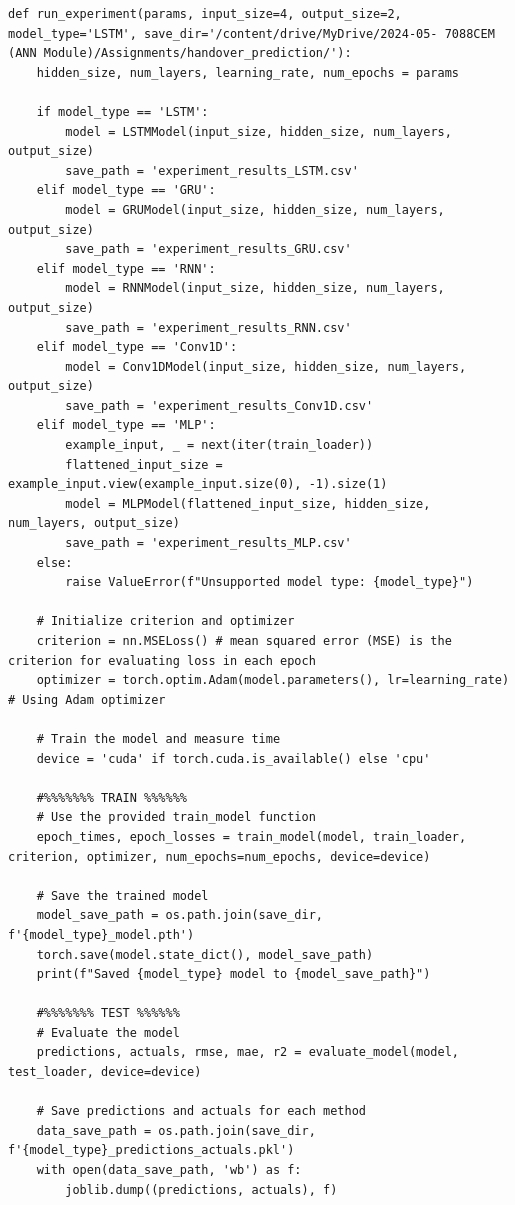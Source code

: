 \documentclass[journal,onecolumn]{IEEEtran}
\begin{document}
{\begin{appendices}
\begin{verbatim}
def run_experiment(params, input_size=4, output_size=2, model_type='LSTM', save_dir='/content/drive/MyDrive/2024-05- 7088CEM (ANN Module)/Assignments/handover_prediction/'):
    hidden_size, num_layers, learning_rate, num_epochs = params

    if model_type == 'LSTM':
        model = LSTMModel(input_size, hidden_size, num_layers, output_size)
        save_path = 'experiment_results_LSTM.csv'
    elif model_type == 'GRU':
        model = GRUModel(input_size, hidden_size, num_layers, output_size)
        save_path = 'experiment_results_GRU.csv'
    elif model_type == 'RNN':
        model = RNNModel(input_size, hidden_size, num_layers, output_size)
        save_path = 'experiment_results_RNN.csv'
    elif model_type == 'Conv1D':
        model = Conv1DModel(input_size, hidden_size, num_layers, output_size)
        save_path = 'experiment_results_Conv1D.csv'
    elif model_type == 'MLP':
        example_input, _ = next(iter(train_loader))
        flattened_input_size = example_input.view(example_input.size(0), -1).size(1)
        model = MLPModel(flattened_input_size, hidden_size, num_layers, output_size)
        save_path = 'experiment_results_MLP.csv'
    else:
        raise ValueError(f"Unsupported model type: {model_type}")

    # Initialize criterion and optimizer
    criterion = nn.MSELoss() # mean squared error (MSE) is the criterion for evaluating loss in each epoch
    optimizer = torch.optim.Adam(model.parameters(), lr=learning_rate) # Using Adam optimizer

    # Train the model and measure time
    device = 'cuda' if torch.cuda.is_available() else 'cpu'

    #%%%%%%% TRAIN %%%%%%
    # Use the provided train_model function
    epoch_times, epoch_losses = train_model(model, train_loader, criterion, optimizer, num_epochs=num_epochs, device=device)

    # Save the trained model
    model_save_path = os.path.join(save_dir, f'{model_type}_model.pth')
    torch.save(model.state_dict(), model_save_path)
    print(f"Saved {model_type} model to {model_save_path}")
    
    #%%%%%%% TEST %%%%%%
    # Evaluate the model
    predictions, actuals, rmse, mae, r2 = evaluate_model(model, test_loader, device=device)

    # Save predictions and actuals for each method
    data_save_path = os.path.join(save_dir, f'{model_type}_predictions_actuals.pkl')
    with open(data_save_path, 'wb') as f:
        joblib.dump((predictions, actuals), f) 


\end{verbatim}
\end{appendices}}
\end{document}
